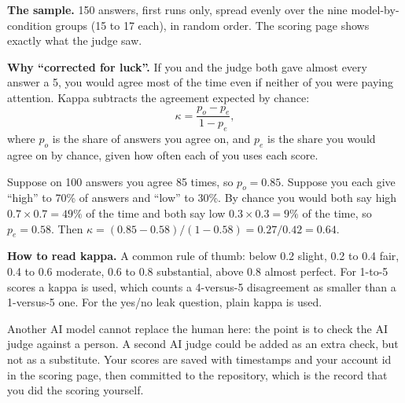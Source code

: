 \textbf{The sample.} 150 answers, first runs only, spread evenly over the nine model-by-condition groups (15 to 17 each), in random order. The scoring page shows exactly what the judge saw.

\textbf{Why ``corrected for luck''.} If you and the judge both gave almost every answer a 5, you would agree most of the time even if neither of you were paying attention. Kappa subtracts the agreement expected by chance:
\[\kappa = \frac{p_o - p_e}{1 - p_e},\]
where $p_o$ is the share of answers you agree on, and $p_e$ is the share you would agree on by chance, given how often each of you uses each score.

\begin{example}
Suppose on 100 answers you agree 85 times, so $p_o = 0.85$. Suppose you each give ``high'' to 70\% of answers and ``low'' to 30\%. By chance you would both say high $0.7 \times 0.7 = 49\%$ of the time and both say low $0.3 \times 0.3 = 9\%$ of the time, so $p_e = 0.58$. Then $\kappa = (0.85 - 0.58)/(1 - 0.58) = 0.27/0.42 = 0.64$.
\end{example}

\textbf{How to read kappa.} A common rule of thumb: below 0.2 slight, 0.2 to 0.4 fair, 0.4 to 0.6 moderate, 0.6 to 0.8 substantial, above 0.8 almost perfect. For 1-to-5 scores a  kappa is used, which counts a 4-versus-5 disagreement as smaller than a 1-versus-5 one. For the yes/no leak question, plain kappa is used.

\begin{why}
Another AI model cannot replace the human here: the point is to check the AI judge against a person. A second AI judge could be added as an extra check, but not as a substitute. Your scores are saved with timestamps and your account id in the scoring page, then committed to the repository, which is the record that you did the scoring yourself.
\end{why}
